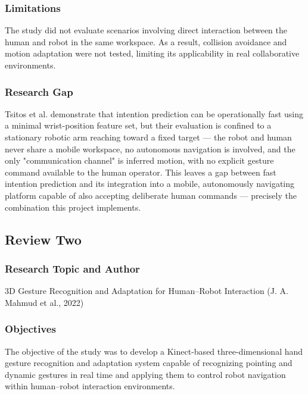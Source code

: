 \subsubsection{Limitations}

The study did not evaluate scenarios involving direct interaction between the human and robot in the same workspace. As a result, collision avoidance and motion adaptation were not tested, limiting its applicability in real collaborative environments.

\subsubsection{Research Gap}

Tsitos et al. demonstrate that intention prediction can be operationally fast using a
minimal wrist-position feature set, but their evaluation is confined to a stationary
robotic arm reaching toward a fixed target — the robot and human never share a mobile
workspace, no autonomous navigation is involved, and the only "communication channel"
is inferred motion, with no explicit gesture command available to the human operator.
This leaves a gap between fast intention prediction and its integration into a mobile,
autonomously navigating platform capable of also accepting deliberate human commands —
precisely the combination this project implements.

\subsection{Review Two}

\subsubsection{Research Topic and Author}

3D Gesture Recognition and Adaptation for Human--Robot Interaction (J. A. Mahmud et al., 2022)

\subsubsection{Objectives}

The objective of the study was to develop a Kinect-based three-dimensional hand gesture recognition and adaptation system capable of recognizing pointing and dynamic gestures in real time and applying them to control robot navigation within human--robot interaction environments.

